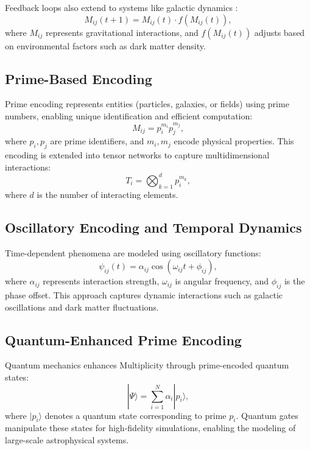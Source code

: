 \documentclass[12]{amsart}
\theoremstyle{plain}
\begin{document}
Feedback loops also extend to systems like galactic dynamics \cite{misner1973gravitation}:
\begin{equation}
M_{ij}(t+1) = M_{ij}(t) \cdot f(M_{ij}(t)),
\end{equation}
where \(M_{ij}\) represents gravitational interactions, and \(f(M_{ij}(t))\) adjusts based on environmental factors such as dark matter density.

\subsection{Prime-Based Encoding}
Prime encoding represents entities (particles, galaxies, or fields) using prime numbers, enabling unique identification and efficient computation:
\begin{equation}
M_{ij} = p_i^{m_i} p_j^{m_j},
\end{equation}
where \(p_i, p_j\) are prime identifiers, and \(m_i, m_j\) encode physical properties. This encoding is extended into tensor networks to capture multidimensional interactions:
\begin{equation}
T_i = \bigotimes_{k=1}^d p_i^{m_k},
\end{equation}
where \(d\) is the number of interacting elements.

\subsection{Oscillatory Encoding and Temporal Dynamics}
Time-dependent phenomena are modeled using oscillatory functions:
\begin{equation}
\psi_{ij}(t) = \alpha_{ij} \cos(\omega_{ij}t + \phi_{ij}),
\end{equation}
where \(\alpha_{ij}\) represents interaction strength, \(\omega_{ij}\) is angular frequency, and \(\phi_{ij}\) is the phase offset. This approach captures dynamic interactions such as galactic oscillations and dark matter fluctuations.

\subsection{Quantum-Enhanced Prime Encoding}
Quantum mechanics enhances Multiplicity through prime-encoded quantum states:
\begin{equation}
|\Psi\rangle = \sum_{i=1}^N \alpha_i |p_i\rangle,
\end{equation}
where \(|p_i\rangle\) denotes a quantum state corresponding to prime \(p_i\). Quantum gates manipulate these states for high-fidelity simulations, enabling the modeling of large-scale astrophysical systems.
\end{document}
